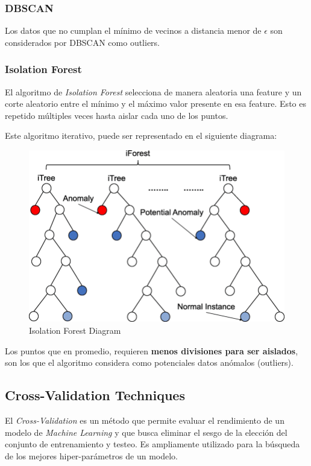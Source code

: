 \subsubsection{DBSCAN}

Los datos que no cumplan el mínimo de vecinos a distancia menor de $\epsilon$ son considerados por DBSCAN como outliers.

\subsubsection{Isolation Forest}

El algoritmo de \textit{Isolation Forest} selecciona de manera aleatoria una feature y un corte aleatorio entre el mínimo y el máximo valor presente en esa feature. Esto es repetido múltiples veces hasta aislar cada uno de los puntos.

Este algoritmo iterativo, puede ser representado en el siguiente diagrama:

\begin{figure}[H]
    \center
    \includegraphics[scale=0.3]{notebooks/Others/img/isolation_forest_diagram.png}
    \caption{Isolation Forest Diagram}
\end{figure}

Los puntos que en promedio, requieren \textbf{menos divisiones para ser aislados}, son los que el algoritmo considera como potenciales datos anómalos (outliers).

\subsection{Cross-Validation Techniques}

El \textit{Cross-Validation} es un método que permite evaluar el rendimiento de un modelo de \textit{Machine Learning} y que busca eliminar el sesgo de la elección del conjunto de entrenamiento y testeo. Es ampliamente utilizado para la búsqueda de los mejores hiper-parámetros de un modelo. 


